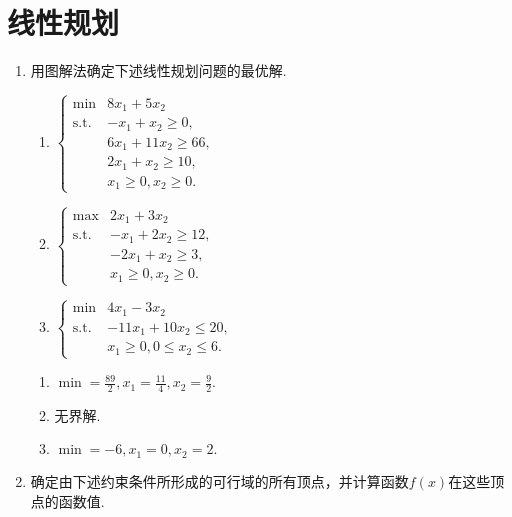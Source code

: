 \section{线性规划}
\begin{enumerate}
    \item 用图解法确定下述线性规划问题的最优解.
    \begin{enumerate}[label=(\arabic*)]
        \item $\begin{cases}
            \min & 8x_1+5x_2\\
            \text{s.t.} & -x_1+x_2 \geqslant 0,\\
            & 6x_1+11x_2 \geqslant 66,\\
            & 2x_1+x_2 \geqslant 10,\\
            & x_1 \geqslant 0, x_2 \geqslant 0.
        \end{cases}$
        \item $\begin{cases}
            \max & 2x_1+3x_2\\
            \text{s.t.} & -x_1+2x_2 \geqslant 12,\\
            & -2x_1+x_2 \geqslant 3,\\
            & x_1 \geqslant 0, x_2 \geqslant 0.
        \end{cases}$
        \item $\begin{cases}
            \min & 4x_1-3x_2\\
            \text{s.t.} & -11x_1+10x_2 \leqslant 20,\\
            & x_1 \geqslant 0, 0 \leqslant x_2 \leqslant 6.
        \end{cases}$
    \end{enumerate}
    \sol
    \begin{enumerate}[label=(\arabic*)]
        \item $\displaystyle\min=\frac{89}{2},x_1=\frac{11}{4},x_2=\frac{9}{2}.$
        \item 无界解.
        \item $\displaystyle\min=-6,x_1=0,x_2=2.$
    \end{enumerate}
    \item 确定由下述约束条件所形成的可行域的所有顶点，并计算函数$f(x)$在这些顶点的函数值.
\end{enumerate}
